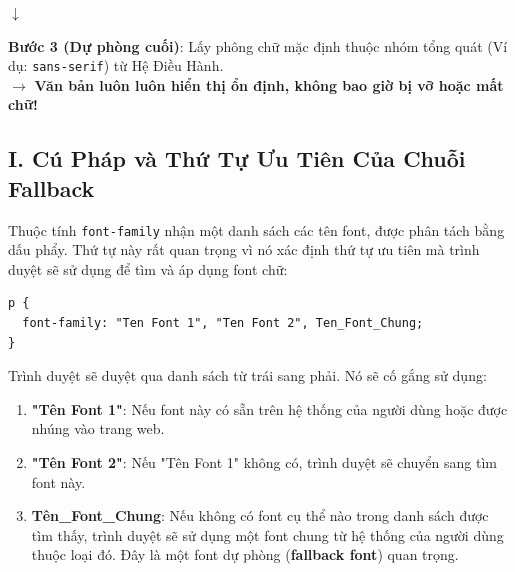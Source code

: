 \documentclass[11pt,oneside]{book}
\newcommand{\codeinline}[1]{\textcolor{accentOrange}{\texttt{#1}}}
\newcommand{\term}[1]{\textbf{\textcolor{primaryBlue}{#1}}}
\begin{document}
\begin{conceptBox}
\begin{center}
\textcolor{primaryBlue!70}{\textbf{$\downarrow$}}
\end{center}
\vspace{-4pt}

\begin{tcolorbox}[arc=5pt, colback=white, colframe=primaryBlue!30, boxrule=0.8pt, top=6pt, bottom=6pt, left=10pt, right=10pt]
  \textbf{\color{primaryBlue}Bước 3 (Dự phòng cuối)}: Lấy phông chữ mặc định thuộc nhóm tổng quát (Ví dụ: \codeinline{sans-serif}) từ Hệ Điều Hành.\\[4pt]
   $\rightarrow$ \textbf{Văn bản luôn luôn hiển thị ổn định, không bao giờ bị vỡ hoặc mất chữ!}
\end{tcolorbox}

\end{conceptBox}
\subsection*{I. Cú Pháp và Thứ Tự Ưu Tiên Của Chuỗi Fallback}

Thuộc tính \codeinline{font-family} nhận một danh sách các tên font, được phân tách bằng dấu phẩy. Thứ tự này rất quan trọng vì nó xác định thứ tự ưu tiên mà trình duyệt sẽ sử dụng để tìm và áp dụng font chữ:

\begin{codeWindow}
\begin{lstlisting}[language=CSS3]
p {
  font-family: "Ten Font 1", "Ten Font 2", Ten_Font_Chung;
}
\end{lstlisting}
\end{codeWindow}

\begin{conceptBox}
Trình duyệt sẽ duyệt qua danh sách từ trái sang phải. Nó sẽ cố gắng sử dụng:
\begin{enumerate}[leftmargin=1.5em, itemsep=3pt, parsep=0pt]
    \item \textbf{"Tên Font 1"}: Nếu font này có sẵn trên hệ thống của người dùng hoặc được nhúng vào trang web.
    \item \textbf{"Tên Font 2"}: Nếu "Tên Font 1" không có, trình duyệt sẽ chuyển sang tìm font này.
    \item \textbf{Tên\_Font\_Chung}: Nếu không có font cụ thể nào trong danh sách được tìm thấy, trình duyệt sẽ sử dụng một font chung từ hệ thống của người dùng thuộc loại đó. Đây là một font dự phòng (\term{fallback font}) quan trọng.
\end{enumerate}
\end{conceptBox}
\end{document}
